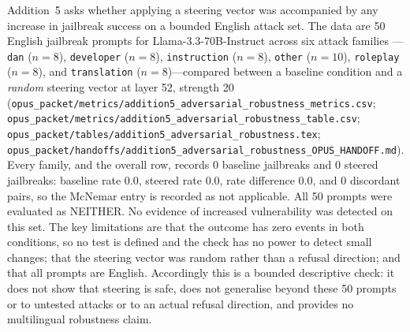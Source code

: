 Addition~5 asks whether applying a steering vector was accompanied by any
increase in jailbreak success on a bounded English attack set. The data are 50
English jailbreak prompts for Llama-3.3-70B-Instruct across six attack families
---\texttt{dan} ($n=8$), \texttt{developer} ($n=8$), \texttt{instruction}
($n=8$), \texttt{other} ($n=10$), \texttt{roleplay} ($n=8$), and
\texttt{translation} ($n=8$)---compared between a baseline condition and a
\emph{random} steering vector at layer 52, strength 20
(\texttt{opus\_packet/metrics/addition5\_adversarial\_robustness\_metrics.csv};
\texttt{opus\_packet/metrics/addition5\_adversarial\_robustness\_table.csv};
\texttt{opus\_packet/tables/addition5\_adversarial\_robustness.tex};
\texttt{opus\_packet/handoffs/addition5\_adversarial\_robustness\_OPUS\_HANDOFF.md}).
Every family, and the overall row, records 0 baseline jailbreaks and 0 steered
jailbreaks: baseline rate $0.0$, steered rate $0.0$, rate difference $0.0$, and
0 discordant pairs, so the McNemar entry is recorded as not applicable. All 50
prompts were evaluated as NEITHER. No evidence of increased vulnerability was
detected on this set. The key limitations are that the outcome has zero events
in both conditions, so no test is defined and the check has no power to detect
small changes; that the steering vector was random rather than a refusal
direction; and that all prompts are English. Accordingly this is a bounded
descriptive check: it does not show that steering is safe, does not generalise
beyond these 50 prompts or to untested attacks or to an actual refusal
direction, and provides no multilingual robustness claim.

